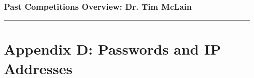 \hypertarget{h.9vddyurbqkh1}{\subsubsection{\texorpdfstring{{Past
Competitions Overview: Dr. Tim
McLain}}{Past Competitions Overview: Dr. Tim McLain}}\label{h.9vddyurbqkh1}}

\begin{center}\rule{0.5\linewidth}{\linethickness}\end{center}

\section{\texorpdfstring{{}}{}}\label{h.r61o3pbzck6b}

\hypertarget{h.ejo1f4jddl42}{\section{\texorpdfstring{{Appendix D:
Passwords and IP
Addresses}}{Appendix D: Passwords and IP Addresses}}\label{h.ejo1f4jddl42}}

{}

\protect\hypertarget{t.84dd1a33902fe0492f6782293762a3c505f2c39e}{}{}\protect\hypertarget{t.2}{}{}

